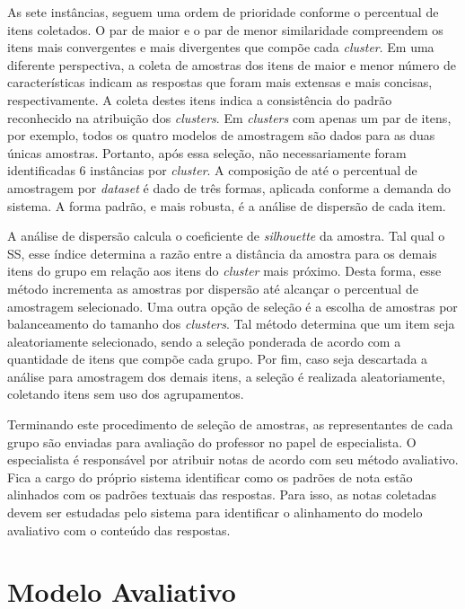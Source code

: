 \begin{minipage}[!h]{0.45\textwidth}
As sete instâncias, seguem uma ordem de prioridade conforme o percentual de itens coletados. O par de maior e o par de menor similaridade compreendem os itens mais convergentes e mais divergentes que compõe cada \textit{cluster}. Em uma diferente perspectiva, a coleta de amostras dos itens de maior e menor número de características indicam as respostas que foram mais extensas e mais concisas, respectivamente. A coleta destes itens indica a consistência do padrão reconhecido na atribuição dos \textit{clusters}. Em \textit{clusters} com apenas um par de itens, por exemplo, todos os quatro modelos de amostragem são dados para as duas únicas amostras. Portanto, após essa seleção, não necessariamente foram identificadas 6 instâncias por \textit{cluster}. A composição de até o percentual de amostragem por \textit{dataset} é dado de três formas, aplicada conforme a demanda do sistema. A forma padrão, e mais robusta, é a análise de dispersão de cada item.

A análise de dispersão calcula o coeficiente de \textit{silhouette} da amostra. Tal qual o SS, esse índice determina a razão entre a distância da amostra para os demais itens do grupo em relação aos itens do \textit{cluster} mais próximo. Desta forma, esse método incrementa as amostras por dispersão até alcançar o percentual de amostragem selecionado. Uma outra opção de seleção é a escolha de amostras por balanceamento do tamanho dos \textit{clusters}. Tal método determina que um item seja aleatoriamente selecionado, sendo a seleção ponderada de acordo com a quantidade de itens que compõe cada grupo. Por fim, caso seja descartada a análise para amostragem dos demais itens, a seleção é realizada aleatoriamente, coletando itens sem uso dos agrupamentos.

Terminando este procedimento de seleção de amostras, as representantes de cada grupo são enviadas para avaliação do professor no papel de especialista. O especialista é responsável por atribuir notas de acordo com seu método avaliativo. Fica a cargo do próprio sistema identificar como os padrões de nota estão alinhados com os padrões textuais das respostas. Para isso, as notas coletadas devem ser estudadas pelo sistema para identificar o alinhamento do modelo avaliativo com o conteúdo das respostas.

\section{Modelo Avaliativo}


\end{minipage}
